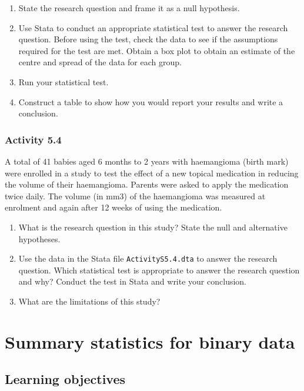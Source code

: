 \documentclass[
]{memoir}
\providecommand{\tightlist}{%
  \setlength{\itemsep}{0pt}\setlength{\parskip}{0pt}}
\begin{document}
\begin{enumerate}
\def\labelenumi{\alph{enumi})}
\tightlist
\item
  State the research question and frame it as a null hypothesis.
\item
  Use Stata to conduct an appropriate statistical test to answer the research question. Before using the test, check the data to see if the assumptions required for the test are met. Obtain a box plot to obtain an estimate of the centre and spread of the data for each group.
\item
  Run your statistical test.
\item
  Construct a table to show how you would report your results and write a conclusion.
\end{enumerate}

\hypertarget{activity-5.4}{%
\subsection*{Activity 5.4}\label{activity-5.4}}

A total of 41 babies aged 6 months to 2 years with haemangioma (birth mark) were enrolled in a study to test the effect of a new topical medication in reducing the volume of their haemangioma. Parents were asked to apply the medication twice daily. The volume (in mm3) of the haemangioma was measured at enrolment and again after 12 weeks of using the medication.

\begin{enumerate}
\def\labelenumi{\alph{enumi})}
\tightlist
\item
  What is the research question in this study? State the null and alternative hypotheses.
\item
  Use the data in the Stata file \texttt{ActivityS5.4.dta} to answer the research question. Which statistical test is appropriate to answer the research question and why? Conduct the test in Stata and write your conclusion.
\item
  What are the limitations of this study?
\end{enumerate}

\hypertarget{summary-statistics-for-binary-data}{%
\chapter{Summary statistics for binary data}\label{summary-statistics-for-binary-data}}

\hypertarget{learning-objectives-5}{%
\section*{Learning objectives}\label{learning-objectives-5}}
\end{document}
